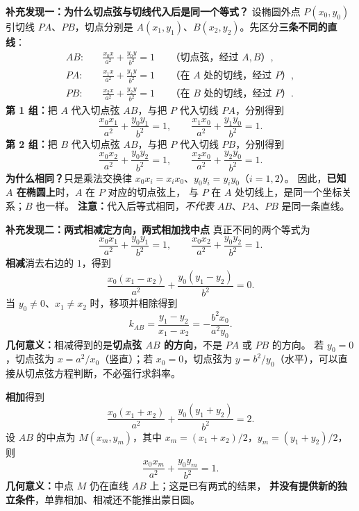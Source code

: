 \begin{summarybox}
  \medskip

  \medskip
  \textbf{\textcolor{CSummary}{补充发现一：为什么切点弦与切线代入后是同一个等式？}}
  设椭圆外点 $P(x_0,y_0)$ 引切线 $PA$、$PB$，切点分别是
  $A(x_1,y_1)$、$B(x_2,y_2)$。先区分\textbf{三条不同的直线}：
  \[
    \begin{aligned}
      AB:&\quad \frac{x_0x}{a^2}+\frac{y_0y}{b^2}=1
        &&\text{（切点弦，经过 }A,B\text{）},\\
      PA:&\quad \frac{x_1x}{a^2}+\frac{y_1y}{b^2}=1
        &&\text{（在 }A\text{ 处的切线，经过 }P\text{）},\\
      PB:&\quad \frac{x_2x}{a^2}+\frac{y_2y}{b^2}=1
        &&\text{（在 }B\text{ 处的切线，经过 }P\text{）}.
    \end{aligned}
  \]
  \textbf{第 1 组：}把 $A$ 代入切点弦 $AB$，与把 $P$ 代入切线 $PA$，分别得到
  \[
    \frac{x_0x_1}{a^2}+\frac{y_0y_1}{b^2}=1,
    \qquad
    \frac{x_1x_0}{a^2}+\frac{y_1y_0}{b^2}=1.
  \]
  \textbf{第 2 组：}把 $B$ 代入切点弦 $AB$，与把 $P$ 代入切线 $PB$，分别得到
  \[
    \frac{x_0x_2}{a^2}+\frac{y_0y_2}{b^2}=1,
    \qquad
    \frac{x_2x_0}{a^2}+\frac{y_2y_0}{b^2}=1.
  \]
  \textbf{为什么相同？}只是乘法交换律 $x_0x_i=x_ix_0$、$y_0y_i=y_iy_0$（$i=1,2$）。
  因此，\textbf{已知 $A$ 在椭圆上}时，$A$ 在 $P$ 对应的切点弦上，
  与 $P$ 在 $A$ 处切线上，是同一个坐标关系；$B$ 也一样。
  \textbf{注意：}代入后等式相同，\emph{不代表} $AB$、$PA$、$PB$ 是同一条直线。

  \medskip
  \textbf{\textcolor{CSummary}{补充发现二：两式相减定方向，两式相加找中点}}
  真正不同的两个等式为
  \[
    \frac{x_0x_1}{a^2}+\frac{y_0y_1}{b^2}=1,
    \qquad
    \frac{x_0x_2}{a^2}+\frac{y_0y_2}{b^2}=1.
  \]
  \textbf{相减}消去右边的 $1$，得到
  \[
    \frac{x_0(x_1-x_2)}{a^2}
      +\frac{y_0(y_1-y_2)}{b^2}=0.
  \]
  当 $y_0\ne0$、$x_1\ne x_2$ 时，移项并相除得到
  \[
    \boxed{k_{AB}=\frac{y_1-y_2}{x_1-x_2}
      =-\frac{b^2x_0}{a^2y_0}}.
  \]
  \textbf{几何意义：}相减得到的是\textbf{切点弦 $AB$ 的方向}，不是 $PA$ 或 $PB$ 的方向。
  若 $y_0=0$，切点弦为 $x=a^2/x_0$（竖直）；若 $x_0=0$，切点弦为
  $y=b^2/y_0$（水平），可以直接从切点弦方程判断，不必强行求斜率。

  \textbf{相加}得到
  \[
    \frac{x_0(x_1+x_2)}{a^2}
      +\frac{y_0(y_1+y_2)}{b^2}=2.
  \]
  设 $AB$ 的中点为 $M(x_m,y_m)$，其中
  $x_m=(x_1+x_2)/2$，$y_m=(y_1+y_2)/2$，则
  \[
    \boxed{\frac{x_0x_m}{a^2}+\frac{y_0y_m}{b^2}=1}.
  \]
  \textbf{几何意义：}中点 $M$ 仍在直线 $AB$ 上；这是已有两式的结果，
  \textbf{并没有提供新的独立条件}，单靠相加、相减还不能推出蒙日圆。


\end{summarybox}
